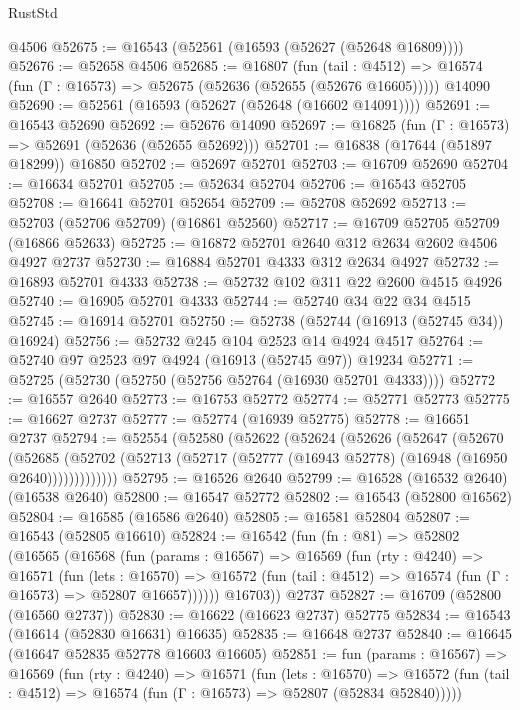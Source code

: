 \begin{lexlean}{RustStd}
\begin{coremodule}
    @4506
@52675 := @16543 (@52561 (@16593 (@52627 (@52648 @16809))))
@52676 := @52658 @4506
@52685 := @16807
    (fun (tail : @4512) => @16574 (fun (Γ : @16573) => @52675 (@52636 (@52655 (@52676 @16605)))))
    @14090
@52690 := @52561 (@16593 (@52627 (@52648 (@16602 @14091))))
@52691 := @16543 @52690
@52692 := @52676 @14090
@52697 := @16825 (fun (Γ : @16573) => @52691 (@52636 (@52655 @52692)))
@52701 := @16838 (@17644 (@51897 @18299)) @16850
@52702 := @52697 @52701
@52703 := @16709 @52690
@52704 := @16634 @52701
@52705 := @52634 @52704
@52706 := @16543 @52705
@52708 := @16641 @52701 @52654
@52709 := @52708 @52692
@52713 := @52703 (@52706 @52709) (@16861 @52560)
@52717 := @16709 @52705 @52709 (@16866 @52633)
@52725 := @16872 @52701 @2640 @312 @2634 @2602 @4506 @4927 @2737
@52730 := @16884 @52701 @4333 @312 @2634 @4927
@52732 := @16893 @52701 @4333
@52738 := @52732 @102 @311 @22 @2600 @4515 @4926
@52740 := @16905 @52701 @4333
@52744 := @52740 @34 @22 @34 @4515
@52745 := @16914 @52701
@52750 := @52738 (@52744 (@16913 (@52745 @34)) @16924)
@52756 := @52732 @245 @104 @2523 @14 @4924 @4517
@52764 := @52740 @97 @2523 @97 @4924 (@16913 (@52745 @97)) @19234
@52771 := @52725 (@52730 (@52750 (@52756 @52764 (@16930 @52701 @4333))))
@52772 := @16557 @2640
@52773 := @16753 @52772
@52774 := @52771 @52773
@52775 := @16627 @2737
@52777 := @52774 (@16939 @52775)
@52778 := @16651 @2737
@52794 := @52554
    (@52580
      (@52622
        (@52624
          (@52626
            (@52647
              (@52670
                (@52685
                  (@52702 (@52713 (@52717 (@52777 (@16943 @52778) (@16948 (@16950 @2640)))))))))))))
@52795 := @16526 @2640
@52799 := @16528 (@16532 @2640) (@16538 @2640)
@52800 := @16547 @52772
@52802 := @16543 (@52800 @16562)
@52804 := @16585 (@16586 @2640)
@52805 := @16581 @52804
@52807 := @16543 (@52805 @16610)
@52824 := @16542
    (fun (fn : @81) =>
    @52802
      (@16565
        (@16568
          (fun (params : @16567) =>
          @16569
            (fun (rty : @4240) =>
            @16571
              (fun (lets : @16570) =>
              @16572 (fun (tail : @4512) => @16574 (fun (Γ : @16573) => @52807 @16657))))))
        @16703))
    @2737
@52827 := @16709 (@52800 (@16560 @2737))
@52830 := @16622 (@16623 @2737) @52775
@52834 := @16543 (@16614 (@52830 @16631) @16635)
@52835 := @16648 @2737
@52840 := @16645 (@16647 @52835 @52778 @16603 @16605)
@52851 := fun (params : @16567) =>
  @16569
    (fun (rty : @4240) =>
    @16571
      (fun (lets : @16570) =>
      @16572 (fun (tail : @4512) => @16574 (fun (Γ : @16573) => @52807 (@52834 @52840)))))

\end{coremodule}
\end{lexlean}

